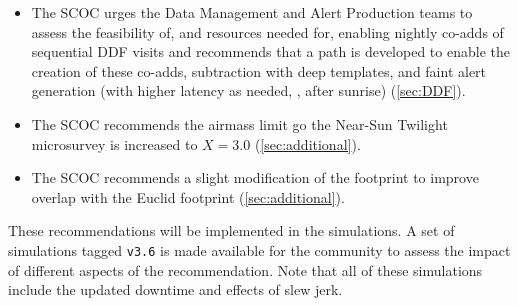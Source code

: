 \begin{itemize}
\item The SCOC urges the Data Management and Alert Production teams to assess the feasibility of, and resources needed for, enabling nightly co-adds of sequential DDF visits and recommends that a path is developed to enable the creation of these co-adds, subtraction with deep templates, and faint alert generation (with higher latency as needed, \eg , after sunrise) (\autoref{sec:DDF}). 

\item The SCOC recommends the airmass limit go the Near-Sun Twilight microsurvey is increased to $X=3.0$ (\autoref{sec:additional}).

\item The SCOC recommends a slight modification of the  footprint to improve overlap with the Euclid footprint (\autoref{sec:additional}). 

\end{itemize}

These recommendations will be implemented in the  simulations. A set of simulations tagged \texttt{v3.6} is made available for the community to assess the impact of different aspects of the recommendation. Note that all of these simulations include the updated downtime and effects of slew jerk. 

